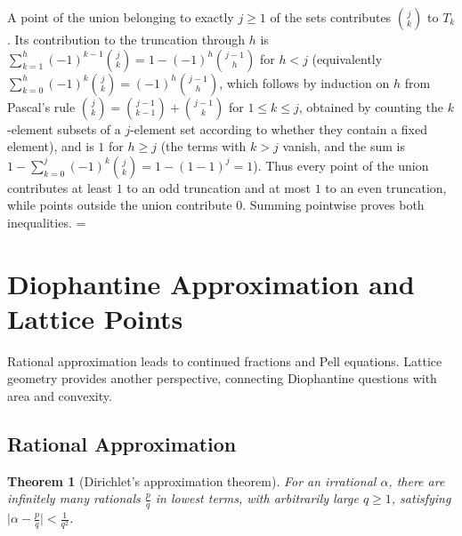 \documentclass[11pt]{article}
\makeatletter
\theoremstyle{ntstyle}
\newtheorem{theorem}{Theorem}[subsection]
\let\nt@closedisplay\]
\def\nt@guardedclose{\@ifnextchar\par{\nt@closeafterpar}{\@ifnextchar\end{\postdisplaypenalty\@M\nt@closedisplay}{\nt@closedisplay}}}
\def\nt@closeafterpar\par{\@ifnextchar\par{\nt@closeafterpar}{\@ifnextchar\end{\postdisplaypenalty\@M\nt@closedisplay\par}{\nt@closedisplay\par}}}
\renewenvironment{proof}[1][\proofname]{\par
  \pushQED{\qed}\normalfont\topsep\medskipamount\edef\nt@afterproof{\@endparpenalty=\the\@endparpenalty\relax}\@beginparpenalty\@M\@endparpenalty\@M\let\]\nt@guardedclose\trivlist\item[]\textit{#1\@addpunct{.}} \ignorespaces}{\ifvmode\addpenalty\@M\fi\popQED\nt@afterproof\endtrivlist\@endpefalse}
\makeatother
\begin{document}
\begin{proof} A point of the union belonging to exactly $j\ge1$ of the
	sets contributes $\binom{j}{k}$ to $T_k$. Its contribution to the
	truncation through $h$ is $\sum_{k=1}^{h}(-1)^{k-1}\binom{j}{k}=1-(-1)^h\binom{j-1}{h}$ for $h<j$ (equivalently
	$\sum_{k=0}^{h}(-1)^{k}\binom{j}{k}=(-1)^{h}\binom{j-1}{h}$, which
		follows by induction on $h$ from Pascal's rule
	$\binom{j}{k}=\binom{j-1}{k-1}+\binom{j-1}{k}$ for $1\le k\le j$, obtained by counting the
	$k$-element subsets of a $j$-element set according to whether they contain a fixed element), and
	is $1$ for $h\ge j$ (the terms with $k>j$ vanish, and the sum is
	$1-\sum_{k=0}^{j}(-1)^k\binom{j}{k}=1-(1-1)^j=1$). Thus
		every point of the union contributes at least $1$ to an odd truncation and at
		most $1$ to an even truncation, while points outside the union
		contribute $0$. Summing pointwise proves both inequalities.
\end{proof}
\clearpage

\section{Diophantine Approximation and Lattice Points}

Rational approximation leads to continued fractions and Pell equations. Lattice geometry provides another
perspective, connecting Diophantine questions with area and convexity.

\subsection{Rational Approximation}

\begin{theorem}[Dirichlet's approximation theorem]\label{thm:10.1.1} For an irrational $\alpha$,
	there are infinitely many rationals $\tfrac{p}{q}$ in lowest terms, with
	arbitrarily large $q\ge1$, satisfying $\big|\alpha - \tfrac{p}{q}\big| <
		\tfrac{1}{q^2}$.
\end{theorem}
\end{document}
